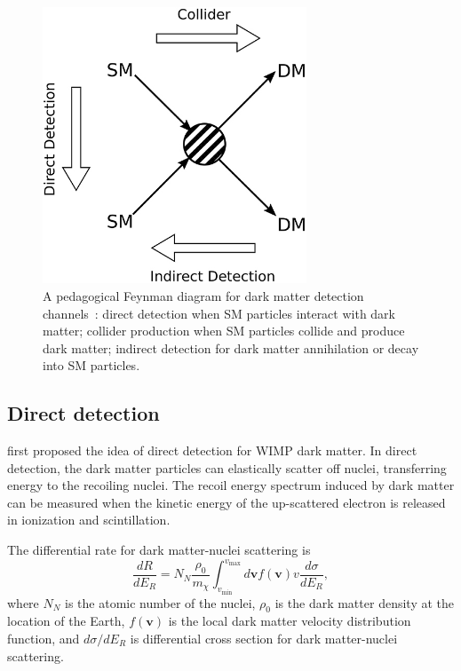 \documentclass[doublespace,nopageskip]{VTthesis}
\begin{document}
\begin{figure}[htb]
    \centering
    \includegraphics[width=0.7\textwidth]{Figures/Intro/dm_diagram.jpg}
    \caption{A pedagogical Feynman diagram for dark matter detection channels~\cite{2019FrP.....7...75G}: direct detection when SM particles interact with dark matter; collider production when SM particles collide and produce dark matter; indirect detection for dark matter annihilation or decay into SM particles.}
    \label{fig:dm_search}
\end{figure}

\subsection{Direct detection}

\citet{1985PhRvD..31.3059G} first proposed the idea of direct detection for WIMP dark matter. In direct detection, the dark matter particles can elastically scatter off nuclei, transferring energy to the recoiling nuclei. The recoil energy spectrum induced by dark matter can be measured when the kinetic energy of the up-scattered electron is released in ionization and scintillation. 

The differential rate for dark matter-nuclei scattering is
\begin{equation}
    \frac{dR}{dE_R} = N_N\frac{\rho_0}{m_\chi}\int_{v_\mathrm{min}}^{v_\mathrm{max}}d\bm{v}f(\bm{v})v\frac{d\sigma}{dE_R},
\end{equation}
where $N_N$ is the atomic number of the nuclei, $\rho_0$ is the dark matter density at the location of the Earth, $f(\bm{v})$ is the local dark matter velocity distribution function, and $d\sigma/dE_R$ is differential cross section for dark matter-nuclei scattering.
\end{document}
